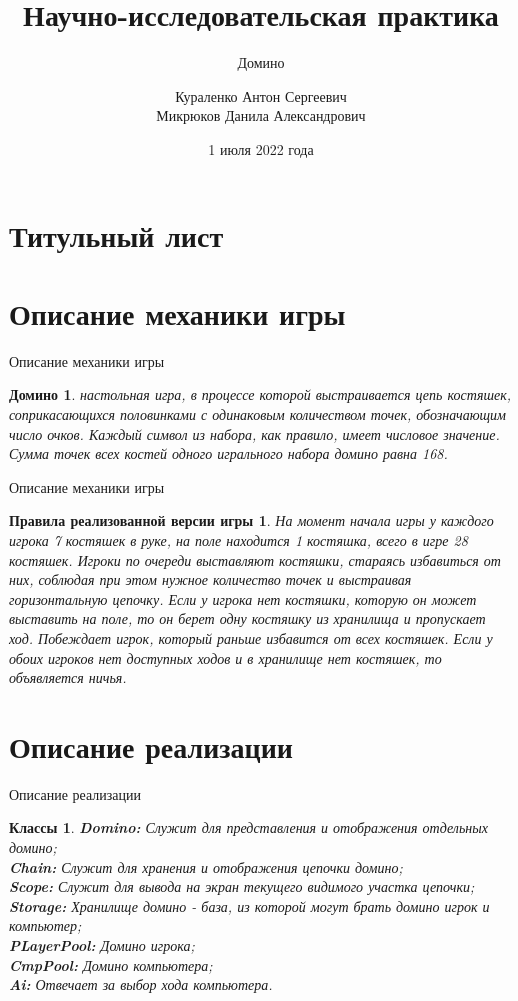 \documentclass[handout]{beamer}
\title{Научно-исследовательская практика}
\subtitle{Домино}
\author{Кураленко Антон Сергеевич\\Микрюков Данила Александрович}
\institute{Институт физико-математических наук и информационных технологий БФУ им. И. Канта}
\date{1 июля 2022 года}
\newtheorem*{myproblem}{Домино}
\newtheorem*{rules}{Правила реализованной версии игры}
\newtheorem*{classes1}{Классы}
\begin{document}
	
	\section{Титульный лист}
	\begin{frame}
		\titlepage
	\end{frame}
	
	\section{Описание механики игры}
	\begin{frame}{Описание механики игры}
		\begin{myproblem}
		 настольная игра, в процессе которой выстраивается цепь костяшек, соприкасающихся половинками с одинаковым количеством точек, обозначающим число очков. Каждый символ из набора, как правило, имеет числовое значение. Сумма точек всех костей одного игрального набора домино равна 168.
		\end{myproblem}
	\end{frame}

	\begin{frame}{Описание механики игры}
	\begin{rules}
		На момент начала игры у каждого игрока 7 костяшек в руке, на поле находится 1 костяшка, всего в игре 28 костяшек. Игроки по очереди выставляют костяшки, стараясь избавиться от них, соблюдая при этом нужное количество точек и выстраивая горизонтальную цепочку. Если у игрока нет костяшки, которую он может выставить на поле, то он берет одну костяшку из хранилища и пропускает ход. Побеждает игрок, который раньше избавится от всех костяшек. Если у обоих игроков нет доступных ходов и в хранилище нет костяшек, то объявляется ничья. 
	\end{rules}
\end{frame}
	
	\section{Описание реализации}
	\begin{frame}{Описание реализации}
		\begin{classes1}
			\textbf{Domino:} Служит для представления и отображения отдельных домино;\\
			\textbf{Chain:} Служит для хранения и отображения цепочки домино;\\
			\textbf{Scope:} Служит для вывода на экран текущего видимого участка цепочки;\\
			\textbf{Storage:} Хранилище домино - база, из которой могут брать домино игрок и компьютер;\\
			\textbf{PLayerPool:} Домино игрока;\\
			\textbf{CmpPool:} Домино компьютера;\\
			\textbf{Ai:} Отвечает за выбор хода компьютера. 
		
		\end{classes1}
 	 \end{frame}
  
\end{document}
